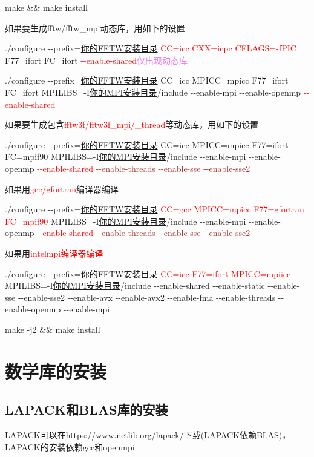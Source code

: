 \documentclass[10pt,a4paper]{article}
\begin{document}
make \&\& make install

如果要生成\textrm{fftw/fftw\_mpi}动态库，用如下的设置

./configure -\/-prefix=\underline{你的FFTW安装目录} \textcolor{red}{CC=icc CXX=icpc CFLAGS=-fPIC} F77=ifort FC=ifort \textcolor{red}{-\/-enable-shared}\;\;\;\textcolor{violet}{仅出现动态库}

./configure -\/-prefix=\underline{你的FFTW安装目录} CC=icc MPICC=mpicc F77=ifort FC=ifort MPILIBS=-I\underline{你的MPI安装目录}/include -\/-enable-mpi -\/-enable-openmp \textcolor{red}{-\/-enable-shared}

如果要生成包含\textrm{\textcolor{red}{fftw3f/fftw3f\_mpi/\_thread}}等动态库，用如下的设置

./configure -\/-prefix=\underline{你的FFTW安装目录} CC=icc MPICC=mpicc F77=ifort FC=mpif90 MPILIBS=-I\underline{你的MPI安装目录}/include -\/-enable-mpi  -\/-enable-openmp \textcolor{red}{-\/-enable-shared }\textcolor{brown}{ -\/-enable-threads -\/-enable-sse -\/-enable-sse2}

如果用\textcolor{red}{\textrm{gcc/gfortran}}编译器编译

./configure -\/-prefix=\underline{你的FFTW安装目录} \textcolor{red}{CC=gcc MPICC=mpicc F77=gfortran FC=mpif90} MPILIBS=-I\underline{你的MPI安装目录}/include -\/-enable-mpi  -\/-enable-openmp \textcolor{red}{-\/-enable-shared} \textcolor{brown}{-\/-enable-threads -\/-enable-sse -\/-enable-sse2}

如果用\textcolor{red}{\textrm{intelmpi}编译器编译}

./configure -\/-prefix=\underline{你的FFTW安装目录} \textcolor{red}{CC=icc F77=ifort MPICC=mpiicc} MPILIBS=-I\underline{你的MPI安装目录}/include -\/-enable-shared -\/-enable-static -\/-enable-sse -\/-enable-sse2 -\/-enable-avx -\/-enable-avx2 -\/-enable-fma -\/-enable-threads -\/-enable-openmp -\/-enable-mpi

make -j2 \&\& make install

\section{数学库的安装}
\subsection{{\rm LAPACK}和{\rm BLAS}库的安装}
\textrm{LAPACK}可以在\url{https://www.netlib.org/lapack/}下载(\textrm{LAPACK}依赖\textrm{BLAS})，\textrm{LAPACK}的安装依赖\textrm{gcc}和\textrm{openmpi}
\end{document}
